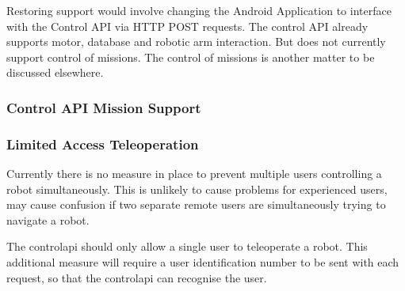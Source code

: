 Restoring support would involve changing the Android Application to interface with the Control API via HTTP POST requests. The control API already supports motor, database and robotic arm interaction. But does not currently support control of missions. The control of missions is another matter to be discussed elsewhere.

\subsubsection{Control API Mission Support}

\subsubsection{Limited Access Teleoperation}
\label{sec:web_future_work_access_tele}
Currently there is no measure in place to prevent multiple users controlling a robot simultaneously. This is unlikely to cause problems for experienced users, may cause confusion if two separate remote users are simultaneously trying to navigate a robot.

The \gls{controlapi} should only allow a single user to teleoperate a robot. This additional measure will require a user identification number to be sent with each request, so that the \gls{controlapi} can recognise the user.


